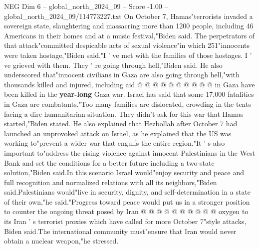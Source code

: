 \begin{textsample}{NEG Dim 6 – global\_north\_2024\_09 – Score -1.00 – global\_north\_2024\_09/114773227.txt}
On October 7, Hamas"terrorists invaded a sovereign state, slaughtering and massacring more than 1200 people, including 46 Americans in their homes and at a music festival,"Biden said.
The perpetrators of that attack"committed despicable acts of sexual violence"in which 251"innocents were taken hostage,"Biden said."I ' ve met with the families of those hostages.
I ' ve grieved with them.
They ' re going through hell,"Biden said.
He also underscored that"innocent civilians in Gaza are also going through hell,"with thousands killed and injured, including aid @ @ @ @ @ @ @ @ @ @ in Gaza have been killed in the \textbf{year-long} Gaza war.
Israel has said that some 17,000 fatalities in Gaza are combatants."Too many families are dislocated, crowding in the tents facing a dire humanitarian situation.
They didn't ask for this war that Hamas started,"Biden stated.
He also explained that Hezbollah after October 7 had launched an unprovoked attack on Israel, as he explained that the US was working to"prevent a wider war that engulfs the entire region."It ' s also important to"address the rising violence against innocent Palestinians in the West Bank and set the conditions for a better future including a two-state solution,"Biden said.In this scenario Israel would"enjoy security and peace and full recognition and normalized relations with all its neighbors,"Biden said.Palestinians would"live in security, dignity, and self-determination in a state of their own,"he said."Progress toward peace would put us in a stronger position to counter the ongoing threat posed by Iran @ @ @ @ @ @ @ @ @ @ oxygen to its Iran ' s terrorist proxies which have called for more October 7"style attacks, Biden said.The international community must"ensure that Iran would never obtain a nuclear weapon,"he stressed.

\end{textsample}
